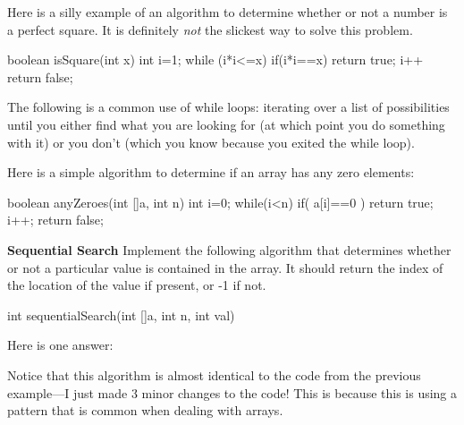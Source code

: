 \begin{exa}
Here is a silly example of an algorithm to determine 
whether or not a number is a perfect square.
It is definitely {\em not} the slickest way to solve this problem.
\begin{code}
boolean isSquare(int x) {
   int i=1;
   while (i*i<=x) {
       if(i*i==x)  return true;
       i++
   }
   return false;
}
\end{code}
\end{exa}

The following is a common use of while loops: iterating over
a list of possibilities until you either find what you are looking
for (at which point you do something with it) or you don't
(which you know because you exited the while loop).

\begin{exa}
Here is a simple algorithm to determine if an array has any zero elements:
\begin{code}
boolean anyZeroes(int []a, int n) {
    int i=0;
    while(i<n) {
       if( a[i]==0 ) { 
           return true;
       }
       i++;
   }
   return false;
}
\end{code}
\end{exa}

\newpage

\begin{exer}
{\bf Sequential Search}
Implement the following algorithm that determines
whether or not a particular value is contained in the array.
It should return the index of the location of the value if present,
or -1 if not.
\begin{code}
int sequentialSearch(int []a, int n, int val) {









}
\end{code}
\begin{answer}
Here is one answer:
\begin{code}
int sequentialSearch(int []a, int n, int val) {
    int i=0;
    while(i<n) {
       if( a[i]==val ) { 
           return i;
       }
       i++;
   }
   return -1;
\end{code}
Notice that this algorithm is almost identical to the code from
the previous example---I just made 3 minor changes to the code!
This is because this is using a pattern that is common when 
dealing with arrays.
\end{answer}
\end{exer}


